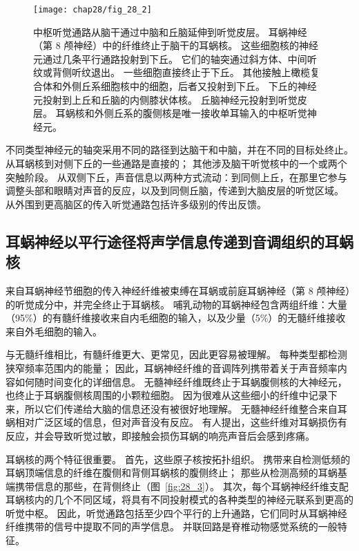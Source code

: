 \begin{figure}[htbp]
	\centering
	\texttt{[image: chap28/fig\_28\_2]}
	\caption{中枢听觉通路从脑干通过中脑和丘脑延伸到听觉皮层。
		耳蜗神经（第 8 颅神经）中的纤维终止于脑干的耳蜗核。
		这些细胞核的神经元通过几条平行通路投射到下丘。
		它们的轴突通过斜方体、中间听纹或背侧听纹退出。
		一些细胞直接终止于下丘。
		其他接触上橄榄复合体和外侧丘系细胞核中的细胞，后者又投射到下丘。
		下丘的神经元投射到上丘和丘脑的内侧膝状体核。
		丘脑神经元投射到听觉皮层。
		耳蜗核和外侧丘系的腹侧核是唯一接收单耳输入的中枢听觉神经元。}
	\label{fig:28_2}
\end{figure}


不同类型神经元的轴突采用不同的路径到达脑干和中脑，并在不同的目标处终止。
从耳蜗核到对侧下丘的一些通路是直接的；
其他涉及脑干听觉核中的一个或两个突触阶段。
从双侧下丘，声音信息以两种方式流动：到同侧上丘，在那里它参与调整头部和眼睛对声音的反应，以及到同侧丘脑，传递到大脑皮层的听觉区域。
从外围到更高脑区的传入听觉通路包括许多级别的传出反馈。



\subsection{耳蜗神经以平行途径将声学信息传递到音调组织的耳蜗核}

来自耳蜗神经节细胞的传入神经纤维被束缚在耳蜗或前庭耳蜗神经（第 8 颅神经）的听觉成分中，并完全终止于耳蜗核。
哺乳动物的耳蜗神经包含两组纤维：大量（95\%）的有髓纤维接收来自内毛细胞的输入，以及少量（5\%）的无髓纤维接收来自外毛细胞的输入。


与无髓纤维相比，有髓纤维更大、更常见，因此更容易被理解。
每种类型都检测狭窄频率范围内的能量；
因此，耳蜗神经纤维的音调阵列携带着关于声音频率内容如何随时间变化的详细信息。
无髓神经纤维既终止于耳蜗腹侧核的大神经元，也终止于耳蜗腹侧核周围的小颗粒细胞。
因为很难从这些细小的纤维中记录下来，所以它们传递给大脑的信息还没有被很好地理解。
无髓神经纤维整合来自耳蜗相对广泛区域的信息，但对声音没有反应。
有人提出，这些纤维对耳蜗损伤有反应，并会导致听觉过敏，即接触会损伤耳蜗的响亮声音后会感到疼痛。


耳蜗核的两个特征很重要。
首先，这些原子核按拓扑组织。
携带来自检测低频的耳蜗顶端信息的纤维在腹侧和背侧耳蜗核的腹侧终止； 
那些从检测高频的耳蜗基端携带信息的那些，在背侧终止（图~\ref{fig:28_3}）。 
其次，每个耳蜗神经纤维支配耳蜗核内的几个不同区域，将具有不同投射模式的各种类型的神经元联系到更高的听觉中枢。
因此，听觉通路包括至少四个平行的上升通路，它们同时从耳蜗神经纤维携带的信号中提取不同的声学信息。
并联回路是脊椎动物感觉系统的一般特征。


